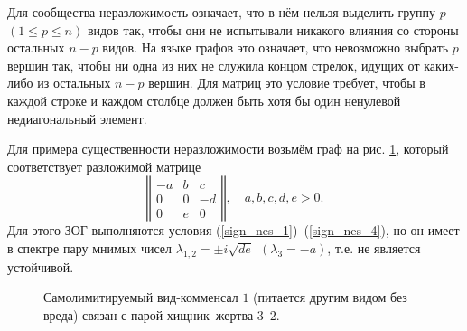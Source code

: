    Для сообщества неразложимость означает, что в нём нельзя выделить группу \(p\) \( (1 \leq p \leq n)\) видов так, чтобы они не испытывали никакого влияния со стороны остальных \(n-p\) видов. На языке графов это означает, что невозможно выбрать \(p\) вершин так, чтобы ни одна из них не служила концом стрелок, идущих от каких-либо из остальных \(n-p\) вершин. Для матриц это условие требует, чтобы в каждой строке и каждом столбце должен быть хотя бы один ненулевой недиагональный элемент.

    Для примера существенности неразложимости возьмём граф на рис. \ref{example_sign_zog_2}, который соответствует разложимой матрице
    \begin{equation}
        \left\Vert \begin{matrix}
            -a & b & c \\
            0 & 0 & -d \\
            0 & e & 0 
        \end{matrix} \right\Vert, 
        \quad a, b, c, d, e > 0.
    \end{equation}
    Для этого ЗОГ выполняются условия (\ref{sign_nes_1})--(\ref{sign_nes_4}), но он имеет в спектре пару мнимых чисел \(\lambda_{1,2} = \pm i \sqrt{de} ~~ (\lambda_3 = -a)\), т.е. не является устойчивой.
    
    \begin{figure}[H]
        \centering
        \caption{Самолимитируемый вид-комменсал \(1\) (питается другим видом без вреда) связан с парой хищник--жертва \(3\)--\(2\).} \label{example_sign_zog_2}
    \end{figure}

